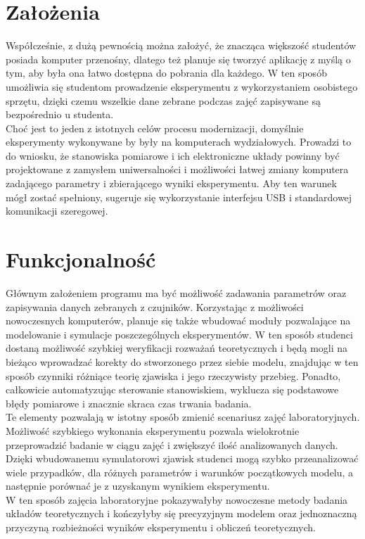 \documentclass[12pt]{article}
\begin{document}
\section*{Założenia}
Współcześnie, z dużą pewnością można założyć, że znacząca większość studentów posiada komputer przenośny, dlatego też planuje się tworzyć aplikację z myślą o tym, aby była ona łatwo dostępna do pobrania dla każdego. W ten sposób umożliwia się studentom prowadzenie eksperymentu z wykorzystaniem osobistego sprzętu, dzięki czemu wszelkie dane zebrane podczas zajęć zapisywane są bezpośrednio u studenta. \\
Choć jest to jeden z istotnych celów procesu modernizacji, domyślnie eksperymenty wykonywane by były na komputerach wydziałowych. Prowadzi to do wniosku, że stanowiska pomiarowe i ich elektroniczne układy powinny być projektowane z zamysłem uniwersalności i możliwości łatwej zmiany komputera zadającego parametry i zbierającego wyniki eksperymentu. Aby ten warunek mógł zostać spełniony, sugeruje się wykorzystanie interfejsu USB i standardowej komunikacji szeregowej.\\
\section*{Funkcjonalność}
Głównym założeniem programu ma być możliwość zadawania parametrów oraz zapisywania danych zebranych z czujników. Korzystając z możliwości nowoczesnych komputerów, planuje się także wbudować moduły pozwalające na modelowanie i symulacje poszczególnych eksperymentów. W ten sposób studenci dostaną możliwość szybkiej weryfikacji rozważań teoretycznych i będą mogli na bieżąco wprowadzać korekty do stworzonego przez siebie modelu, znajdując w ten sposób czynniki różniące teorię zjawiska i jego rzeczywisty przebieg. Ponadto, całkowicie automatyzując sterowanie stanowiskiem, wyklucza się podstawowe błędy pomiarowe i znacznie skraca czas trwania badania. \\
Te elementy pozwalają w istotny sposób zmienić scenariusz zajęć laboratoryjnych. Możliwość szybkiego wykonania eksperymentu pozwala wielokrotnie przeprowadzić badanie w ciągu zajęć i zwiększyć ilość analizowanych danych. Dzięki wbudowanemu symulatorowi zjawisk studenci mogą szybko przeanalizować wiele przypadków, dla różnych parametrów i warunków początkowych modelu, a następnie porównać je z uzyskanym wynikiem eksperymentu. \\
W ten sposób zajęcia laboratoryjne pokazywałyby nowoczesne metody badania układów teoretycznych i kończyłyby się precyzyjnym modelem oraz jednoznaczną przyczyną rozbieżności wyników eksperymentu i obliczeń teoretycznych.
\end{document}
